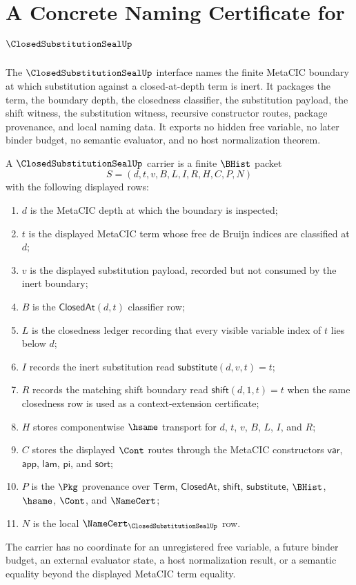 \chapter{A Concrete Naming Certificate for $\ClosedSubstitutionSealUp$}
\label{ch:concrete-instances-closedsubstitutionseal-namecert}

The $\ClosedSubstitutionSealUp$ interface names the finite MetaCIC boundary at which substitution against a closed-at-depth term is inert. It packages the term, the boundary depth, the closedness classifier, the substitution payload, the shift witness, the substitution witness, recursive constructor routes, package provenance, and local naming data. It exports no hidden free variable, no later binder budget, no semantic evaluator, and no host normalization theorem.

\begin{definition}
\label{def:closed-substitution-seal-carrier}
A $\ClosedSubstitutionSealUp$ carrier is a finite $\BHist$ packet
$$
S=(d,t,v,B,L,I,R,H,C,P,N)
$$
with the following displayed rows:
\begin{enumerate}
\item $d$ is the MetaCIC depth at which the boundary is inspected;
\item $t$ is the displayed MetaCIC term whose free de Bruijn indices are classified at $d$;
\item $v$ is the displayed substitution payload, recorded but not consumed by the inert boundary;
\item $B$ is the $\mathsf{ClosedAt}(d,t)$ classifier row;
\item $L$ is the closedness ledger recording that every visible variable index of $t$ lies below $d$;
\item $I$ records the inert substitution read $\mathsf{substitute}(d,v,t)=t$;
\item $R$ records the matching shift boundary read $\mathsf{shift}(d,1,t)=t$ when the same closedness row is used as a context-extension certificate;
\item $H$ stores componentwise $\hsame$ transport for $d$, $t$, $v$, $B$, $L$, $I$, and $R$;
\item $C$ stores the displayed $\Cont$ routes through the MetaCIC constructors $\mathsf{var}$, $\mathsf{app}$, $\mathsf{lam}$, $\mathsf{pi}$, and $\mathsf{sort}$;
\item $P$ is the $\Pkg$ provenance over $\mathsf{Term}$, $\mathsf{ClosedAt}$, $\mathsf{shift}$, $\mathsf{substitute}$, $\BHist$, $\hsame$, $\Cont$, and $\NameCert$;
\item $N$ is the local $\NameCert_{\ClosedSubstitutionSealUp}$ row.
\end{enumerate}
The carrier has no coordinate for an unregistered free variable, a future binder budget, an external evaluator state, a host normalization result, or a semantic equality beyond the displayed MetaCIC term equality.
\end{definition}

